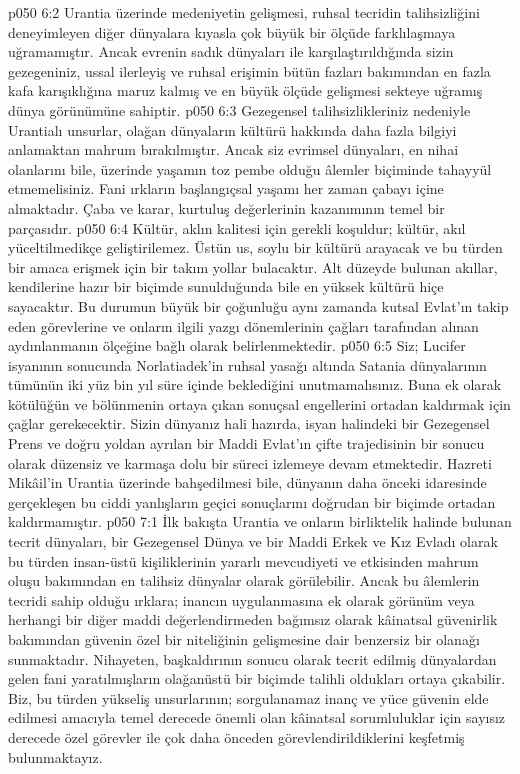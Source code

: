 \vs p050 6:2 Urantia üzerinde medeniyetin gelişmesi, ruhsal tecridin talihsizliğini deneyimleyen diğer dünyalara kıyasla çok büyük bir ölçüde farklılaşmaya uğramamıştır. Ancak evrenin sadık dünyaları ile karşılaştırıldığında sizin gezegeniniz, ussal ilerleyiş ve ruhsal erişimin bütün fazları bakımından en fazla kafa karışıklığına maruz kalmış ve en büyük ölçüde gelişmesi sekteye uğramış dünya görünümüne sahiptir.
\vs p050 6:3 Gezegensel talihsizlikleriniz nedeniyle Urantialı unsurlar, olağan dünyaların kültürü hakkında daha fazla bilgiyi anlamaktan mahrum bırakılmıştır. Ancak siz evrimsel dünyaları, en nihai olanlarını bile, üzerinde yaşamın toz pembe olduğu âlemler biçiminde tahayyül etmemelisiniz. Fani ırkların başlangıçsal yaşamı her zaman çabayı içine almaktadır. Çaba ve karar, kurtuluş değerlerinin kazanımının temel bir parçasıdır.
\vs p050 6:4 Kültür, aklın kalitesi için gerekli koşuldur; kültür, akıl yüceltilmedikçe geliştirilemez. Üstün us, soylu bir kültürü arayacak ve bu türden bir amaca erişmek için bir takım yollar bulacaktır. Alt düzeyde bulunan akıllar, kendilerine hazır bir biçimde sunulduğunda bile en yüksek kültürü hiçe sayacaktır. Bu durumun büyük bir çoğunluğu aynı zamanda kutsal Evlat’ın takip eden görevlerine ve onların ilgili yazgı dönemlerinin çağları tarafından alınan aydınlanmanın ölçeğine bağlı olarak belirlenmektedir.
\vs p050 6:5 Siz; Lucifer isyanının sonucunda Norlatiadek’in ruhsal yasağı altında Satania dünyalarının tümünün iki yüz bin yıl süre içinde beklediğini unutmamalısınız. Buna ek olarak kötülüğün ve bölünmenin ortaya çıkan sonuçsal engellerini ortadan kaldırmak için çağlar gerekecektir. Sizin dünyanız hali hazırda, isyan halindeki bir Gezegensel Prens ve doğru yoldan ayrılan bir Maddi Evlat’ın çifte trajedisinin bir sonucu olarak düzensiz ve karmaşa dolu bir süreci izlemeye devam etmektedir. Hazreti Mikâil’in Urantia üzerinde bahşedilmesi bile, dünyanın daha önceki idaresinde gerçekleşen bu ciddi yanlışların geçici sonuçlarını doğrudan bir biçimde ortadan kaldırmamıştır.
\vs p050 7:1 İlk bakışta Urantia ve onların birliktelik halinde bulunan tecrit dünyaları, bir Gezegensel Dünya ve bir Maddi Erkek ve Kız Evladı olarak bu türden insan\hyp{}üstü kişiliklerinin yararlı mevcudiyeti ve etkisinden mahrum oluşu bakımından en talihsiz dünyalar olarak görülebilir. Ancak bu âlemlerin tecridi sahip olduğu ırklara; inancın uygulanmasına ek olarak görünüm veya herhangi bir diğer maddi değerlendirmeden bağımsız olarak kâinatsal güvenirlik bakımından güvenin özel bir niteliğinin gelişmesine dair benzersiz bir olanağı sunmaktadır. Nihayeten, başkaldırının sonucu olarak tecrit edilmiş dünyalardan gelen fani yaratılmışların olağanüstü bir biçimde talihli oldukları ortaya çıkabilir. Biz, bu türden yükseliş unsurlarının; sorgulanamaz inanç ve yüce güvenin elde edilmesi amacıyla temel derecede önemli olan kâinatsal sorumluluklar için sayısız derecede özel görevler ile çok daha önceden görevlendirildiklerini keşfetmiş bulunmaktayız.
